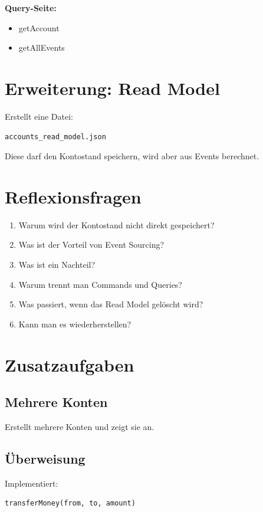 \documentclass[a4paper,12pt]{article}
\begin{document}
\textbf{Query-Seite:}
\begin{itemize}
\item getAccount
\item getAllEvents
\end{itemize}

\section*{Erweiterung: Read Model}

Erstellt eine Datei:

\begin{lstlisting}
accounts_read_model.json
\end{lstlisting}

Diese darf den Kontostand speichern, wird aber aus Events berechnet.

\section*{Reflexionsfragen}

\begin{enumerate}
\item Warum wird der Kontostand nicht direkt gespeichert?
\item Was ist der Vorteil von Event Sourcing?
\item Was ist ein Nachteil?
\item Warum trennt man Commands und Queries?
\item Was passiert, wenn das Read Model gelöscht wird?
\item Kann man es wiederherstellen?
\end{enumerate}

\section*{Zusatzaufgaben}

\subsection*{Mehrere Konten}

Erstellt mehrere Konten und zeigt sie an.

\subsection*{Überweisung}

Implementiert:

\begin{lstlisting}
transferMoney(from, to, amount)
\end{lstlisting}
\end{document}
